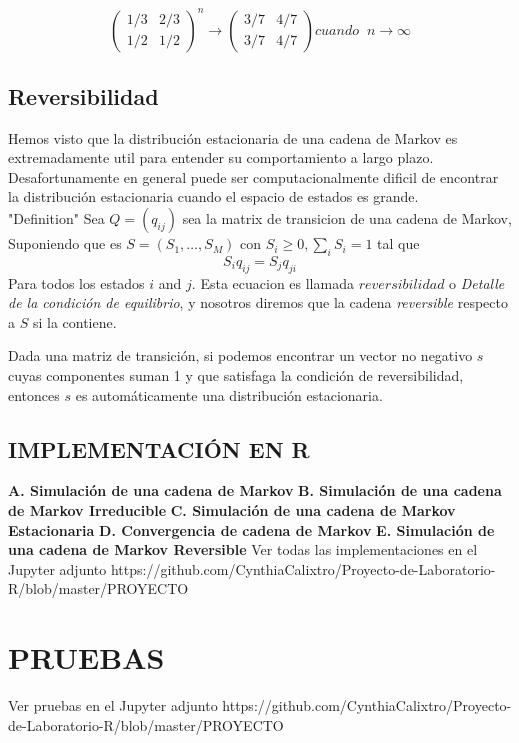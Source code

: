 \documentclass[10pt,a4paper]{article}
\theoremstyle{definition}
\theoremstyle{remark}
\begin{document}
\begin{multicols}{2}
\[
\left( \begin{array}{cccc}
1/3 & 2/3 \\
1/2 & 1/2 \end{array}  \right)^{n}
\rightarrow
\left( \begin{array}{cccc}
3/7 & 4/7 \\
3/7 & 4/7 \end{array}  \right)
cuando \phantom{x} n \rightarrow \infty
\]
\vspace*{1cm}
\subsection{Reversibilidad}
Hemos visto que la distribución estacionaria de una cadena de Markov es extremadamente util para entender su comportamiento a largo plazo. Desafortunamente en general puede ser computacionalmente dificil de encontrar la distribución estacionaria cuando el espacio de estados es grande.\\
"Definition" Sea $Q = (q_{ij})$ sea la matrix de transicion de una cadena de Markov, Suponiendo que es $S=(S_1,\dots,S_M)$ con $S_i\geq0, \sum_{i}S_i = 1$ tal que $$S_{i}q_{ij}=S_{j}q_{ji}$$ Para todos los estados $i$ and $j$. Esta ecuacion es llamada $reversibilidad$ o \textit{Detalle de la condición de equilibrio}, y nosotros diremos que la cadena \textit{reversible} respecto a $S$ si la contiene.

Dada una matriz de transición, si podemos encontrar un vector no negativo $s$ cuyas componentes suman 1 y que satisfaga la condición de reversibilidad, entonces $s$ es automáticamente una distribución estacionaria.

\begin{center}
\section{IMPLEMENTACIÓN EN R}
\end{center}
\textbf{A. Simulación de una cadena de Markov}
\textbf{B. Simulación de una cadena de Markov Irreducible}
\textbf{C. Simulación de una cadena de Markov Estacionaria}
\textbf{D. Convergencia de cadena de Markov}
\textbf{E. Simulación de una cadena de Markov Reversible}
 Ver todas las implementaciones en el Jupyter adjunto https://github.com/CynthiaCalixtro/Proyecto-de-Laboratorio-R/blob/master/PROYECTO%
\section{PRUEBAS}
Ver pruebas en el Jupyter adjunto https://github.com/CynthiaCalixtro/Proyecto-de-Laboratorio-R/blob/master/PROYECTO%

\end{multicols}
\end{document}
